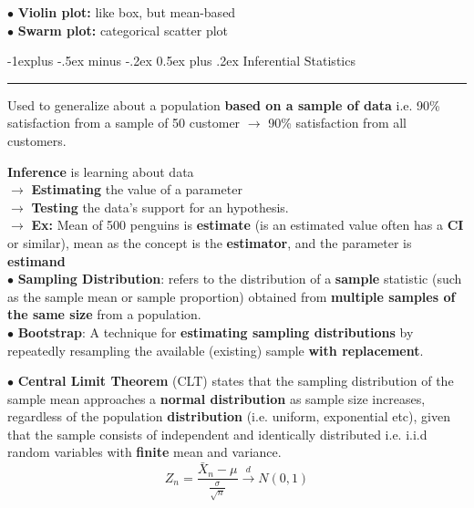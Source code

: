 \documentclass[letterpaper, 10.5pt,landscape]{article}
\makeatletter
\renewcommand{\subsection}{\@startsection{subsection}{2}{0mm}%
                                {-1explus -.5ex minus -.2ex}%
                                {0.5ex plus .2ex}%
                                {\normalfont\normalsize\bfseries}}
\makeatother
\begin{document}
\begin{multicols*}{3}
$\bullet$ \textbf{Violin plot: } like box, but mean-based \\
\vspace{2pt}
$\bullet$ \textbf{Swarm plot: } categorical scatter plot \\
\vspace{2pt}




\subsection{Inferential Statistics} {\color{teal}\hrule height 0.5pt} \smallskip

Used to generalize about a population \textbf{based on a sample of data} i.e. 90\% satisfaction from a sample of 50 customer $\rightarrow$ 90\% satisfaction from all customers. 
\vspace{2pt}

\textbf{Inference} is learning about data \\
$\rightarrow$  \textbf{Estimating} the value of a parameter \\
$\rightarrow$ \textbf{Testing} the data's support for an hypothesis. \\


$\rightarrow$ \textbf{Ex:}  Mean of 500 penguins is \textbf{estimate } (is an estimated value often has a \textbf{CI} or similar), mean as the concept is the \textbf{estimator}, and the parameter is \textbf{estimand} \\

\vspace{2pt}
$\bullet$ \textbf{Sampling Distribution}: refers to the distribution of a \textbf{sample} statistic (such as the sample mean or sample proportion) obtained from \textbf{multiple samples of the same size} from a population. \\

\vspace{2pt}
$\bullet$ \textbf{Bootstrap}: A technique for \textbf{estimating sampling distributions} by repeatedly resampling the available (existing) sample \textbf{with replacement}.


\vspace{2pt}
$\bullet$ \textbf{Central Limit Theorem} (CLT) states that the sampling distribution of the sample mean approaches a \textbf{normal distribution} as sample size increases, regardless of the population \textbf{distribution} (i.e. uniform, exponential etc), given that the sample consists of independent and identically distributed i.e. i.i.d random variables with \textbf{finite} mean and variance.
\vspace{-4pt}
\[\boxed{Z_n = \frac{\bar{X}_n - \mu}{\frac{\sigma}{\sqrt{n}}} \xrightarrow{d} N(0, 1)
}\]
\vspace{-4pt}


\end{multicols*}
\end{document}
